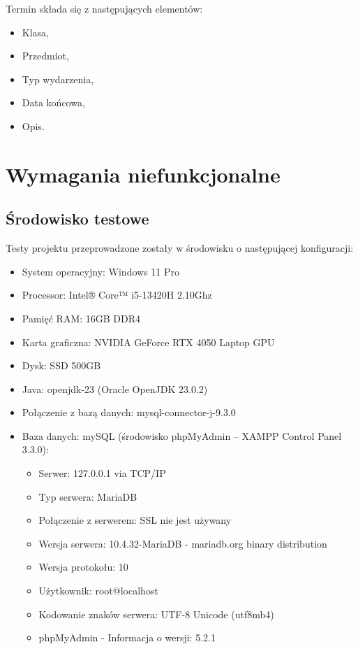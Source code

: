 Termin składa się z następujących elementów:
\begin{itemize}
      \item Klasa,
      \item Przedmiot,
      \item Typ wydarzenia,
      \item Data końcowa,
      \item Opis.
\end{itemize}

\newpage
\section{Wymagania niefunkcjonalne}
\label{wymaganiaNiefunkcjonalne}

\subsection{Środowisko testowe}
\label{środowiskoTestowe}
Testy projektu przeprowadzone zostały w środowisku o następującej konfiguracji:
\begin{itemize}
      \item System operacyjny: Windows 11 Pro
      \item Processor: Intel® Core™ i5-13420H 2.10Ghz
      \item Pamięć RAM: 16GB DDR4
      \item Karta graficzna: NVIDIA GeForce RTX 4050 Laptop GPU
      \item Dysk: SSD 500GB
      \item Java: openjdk-23 (Oracle OpenJDK 23.0.2)
      \item Połączenie z bazą danych: mysql-connector-j-9.3.0
      \item Baza danych: mySQL (środowisko phpMyAdmin – XAMPP Control Panel 3.3.0):
      \begin{itemize}
            \item Serwer: 127.0.0.1 via TCP/IP
            \item Typ serwera: MariaDB
            \item Połączenie z serwerem: SSL nie jest używany  
            \item Wersja serwera: 10.4.32-MariaDB - mariadb.org binary distribution
            \item Wersja protokołu: 10
            \item Użytkownik: root@localhost
            \item Kodowanie znaków serwera: UTF-8 Unicode (utf8mb4)
            \item phpMyAdmin - Informacja o wersji: 5.2.1
      \end{itemize}
\end{itemize}

